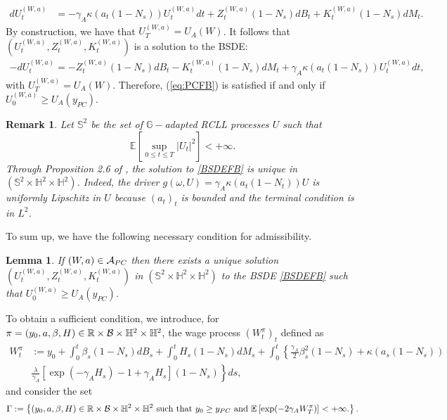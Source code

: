 \documentclass[numbook, envcountsect, envcountsame, envcountreset, runningheads, smallextended]{article}
\newtheorem{Lemma}{Lemma}[part]
\newtheorem{Remark}{Remark}[part]
\def \E{\mathbb{E}}
\def \R{\mathbb{R}}
\def\Ac{{\cal A}}
\def\Bc{{\cal B}}
\begin{document}
 \begin{align*}
 d U_t^{(W,a)}   
 &= -\gamma_A \kappa(a_t(1-N_s) )  U_t^{(W,a)} dt +Z_t^{(W,a)}(1-N_s)  dB_t +  K_t^{(W,a)}(1-N_s)   dM_t.
 \end{align*}
By construction, we have that $U_T^{(W,a)} = U_A(W)$. It follows that
$\left(U_t^{(W,a)}, Z_t^{(W,a)} , K_t^{(W,a)} \right)$ is a solution to the BSDE: 
 \begin{align}\label{BSDEFB}
  - d U_t^{(W,a)} = - Z_t^{(W,a)} (1-N_s) dB_t - K_t^{(W,a)} (1-N_s) dM_t  + \gamma_A \kappa(a_t(1-N_s) )  U_t^{(W,a)} dt,
 \end{align}
 with $U_T^{(W,a)} = U_A(W).$ Therefore,  (\ref{eq:PCFB}) is satisfied if and only if   $U_0^{(W,a)} \geq U_A(y_{PC})$.

\begin{Remark}\label{uniquenessBSDEFB}
Let $\mathbb{S}^2$ be the set of $\mathbb{G}-$adapted RCLL processes $U$ such that $$\E[\sup_{0 \leq t \leq T} | U_t|^2] < + \infty.$$
Through Proposition 2.6 of  \cite{Dumi}, the solution to \eqref{BSDEFB} is unique in $(\mathbb{S}^2\times\mathbb{H}^2\times \mathbb{H}^2)$. Indeed, the driver $g(\omega, U)=\gamma_A \kappa(a_t(1-N_t))  U$ is uniformly Lipschitz in $U$ because $(a_t)_t$ is bounded and the terminal condition is in $L^2$.
\end{Remark}

To sum up, we have the following necessary condition for admissibility.
\begin{Lemma}
If $(W,a) \in \Ac_{PC}$ then there exists a unique solution $\left(U_t^{(W,a)}, Z_t^{(W,a)} , K_t^{(W,a)} \right)$  in $(\mathbb{S}^2\times\mathbb{H}^2\times \mathbb{H}^2)$ to the BSDE \eqref{BSDEFB} such that $U_0^{(W,a)} \geq U_A(y_{PC})$.
\end{Lemma}

To obtain a sufficient condition, we introduce, for $\pi=(y_0, a, \beta, H ) \in \R\times \Bc \times \mathbb{H}^2\times \mathbb{H}^2 $, the wage process $( W_t^{\pi})_t$ defined as
\begin{align}\label{forwardFB}
W_t^{\pi} &:= y_0 + \int_0^t \beta_s (1-N_s)dB_s + \int_0^t H_s (1-N_s)dM_s + \int_0^t \left\{ \frac{\gamma_A}{2} \beta_s^2(1-N_s) + \kappa(a_s(1-N_s)) \right. \nonumber\\
&\left. \frac{\lambda}{\gamma_A} [\exp(-\gamma_A H_s) - 1 + \gamma_A H_s ](1-N_s) \right\} ds,
\end{align}
and consider the set 
$$\Gamma := \left\{ (y_0, a, \beta, H ) \in  \R\times \Bc \times \mathbb{H}^2\times \mathbb{H}^2 \text{ such that } y_0 \ge y_{PC} \text{ and } \E\left[ \exp(-2\gamma_AW_T^\pi)\right]<+\infty.   \right\}.$$
\end{document}
